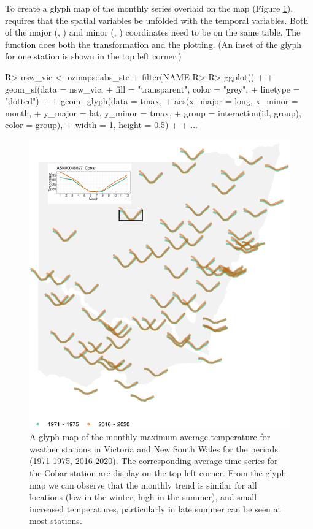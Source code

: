 \documentclass[
]{jss}
\begin{document}
To create a glyph map of the monthly series overlaid on the map (Figure \ref{fig:basic-manip}), requires that the spatial variables be unfolded with the temporal variables. Both of the major (, ) and minor (, ) coordinates need to be on the same table. The  function does both the transformation and the plotting. (An inset of the glyph for one station is shown in the top left corner.)

\begin{CodeChunk}
\begin{CodeInput}
R> nsw_vic <- ozmaps::abs_ste %
+   filter(NAME %
R> 
R> ggplot() +
+   geom_sf(data = nsw_vic,
+           fill = "transparent", color = "grey",
+           linetype = "dotted") +
+   geom_glyph(data = tmax,
+              aes(x_major = long, x_minor = month,
+                  y_major = lat, y_minor = tmax,
+                  group = interaction(id, group), color = group),
+              width = 1, height = 0.5) +
+   ...
\end{CodeInput}
\end{CodeChunk}

\begin{CodeChunk}
\begin{figure}

{\centering \includegraphics[width=0.5\linewidth]{figures/basic-manip-1} 

}

\caption[A glyph map of the monthly maximum average temperature for weather stations in  Victoria and New South Wales for the periods (1971-1975, 2016-2020)]{A glyph map of the monthly maximum average temperature for weather stations in  Victoria and New South Wales for the periods (1971-1975, 2016-2020). The corresponding average time series for the Cobar station are display on the top left corner. From the glyph map we can observe that the monthly trend is similar for all locations (low in the winter, high in the summer), and small increased temperatures, particularly in late summer can be seen at most stations.}\label{fig:basic-manip}
\end{figure}
\end{CodeChunk}
\end{document}
